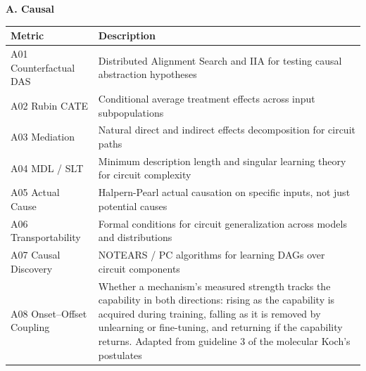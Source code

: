 \documentclass{article}
\begin{document}

\begingroup
\small
\setlength{\tabcolsep}{4pt}
\renewcommand{\arraystretch}{1.15}
\noindent\textbf{A. Causal}\par
\vspace{4pt}\noindent{}
\nopagebreak

\centering
\begin{tabular}{@{}lp{10cm}@{}}
\toprule
\textbf{Metric} & \textbf{Description} \\
\midrule
A01 Counterfactual DAS & Distributed Alignment Search and IIA for testing causal abstraction hypotheses \\
\midrule
A02 Rubin CATE & Conditional average treatment effects across input subpopulations \\
\midrule
A03 Mediation & Natural direct and indirect effects decomposition for circuit paths \\
\midrule
A04 MDL / SLT & Minimum description length and singular learning theory for circuit complexity \\
\midrule
A05 Actual Cause & Halpern-Pearl actual causation on specific inputs, not just potential causes \\
\midrule
A06 Transportability & Formal conditions for circuit generalization across models and distributions \\
\midrule
A07 Causal Discovery & NOTEARS / PC algorithms for learning DAGs over circuit components \\
\midrule
A08 Onset--Offset Coupling & Whether a mechanism's measured strength tracks the capability in both directions: rising as the capability is acquired during training, falling as it is removed by unlearning or fine-tuning, and returning if the capability returns. Adapted from guideline 3 of the molecular Koch's postulates \citep{fredricks1996sequence} \\
\bottomrule
\end{tabular}
\medskip
\end{document}
